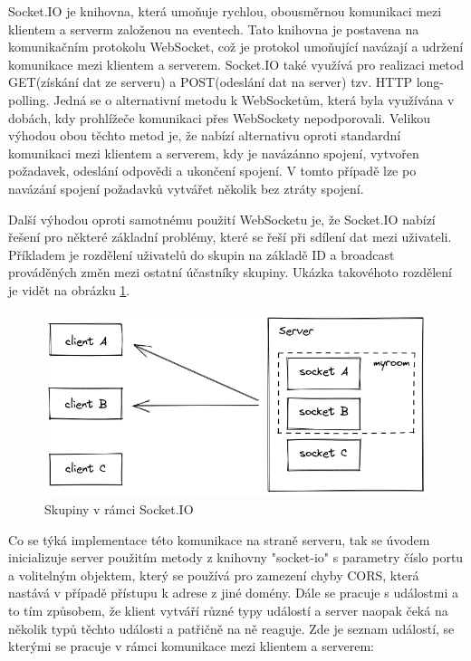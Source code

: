 Socket.IO je knihovna, která umoňuje rychlou, obousměrnou komunikaci mezi klientem a serverm založenou na eventech. \cite{socketIO} Tato knihovna je postavena na komunikačním protokolu WebSocket, což je protokol umoňující navázají a udržení komunikace mezi klientem a serverem. Socket.IO také využívá pro realizaci metod GET(získání dat ze serveru) a POST(odeslání dat na server) tzv. HTTP long-polling. Jedná se o alternativní metodu k WebSocketům, která byla využívána v dobách, kdy prohlížeče komunikaci přes WebSockety nepodporovali. Velikou výhodou obou těchto metod je, že nabízí alternativu oproti standardní komunikaci mezi klientem a serverem, kdy je navázánno spojení, vytvořen požadavek, odeslání odpovědi a ukončení spojení. V tomto případě lze po navázání spojení požadavků vytvářet několik bez ztráty spojení.

Další výhodou oproti samotnému použití WebSocketu je, že Socket.IO nabízí řešení pro některé základní problémy, které se řeší při sdílení dat mezi uživateli. Příkladem je rozdělení uživatelů do skupin na základě ID a broadcast prováděných změn mezi ostatní účastníky skupiny. Ukázka takovéhoto rozdělení je vidět na obrázku \ref{fig:rooms}. 

\begin{figure}[h]
\centering
	\includegraphics[width=1.0\textwidth]{Figures/rooms.png}
	\caption{Skupiny v rámci Socket.IO}
	\label{fig:rooms}
\end{figure}

Co se týká implementace této komunikace na straně serveru, tak se úvodem inicializuje server použitím metody z knihovny "socket-io" s parametry číslo portu a volitelným objektem, který se používá pro zamezení chyby CORS, která nastává v případě přístupu k adrese z jiné domény. Dále se pracuje s událostmi a to tím způsobem, že klient vytváří různé typy událostí a server naopak čeká na několik typů těchto události a patřičně na ně reaguje. Zde je seznam událostí, se kterými se pracuje v rámci komunikace mezi klientem a serverem: 

